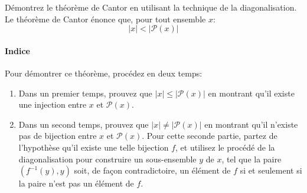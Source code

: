 \documentclass[12pt,french,a4paper]{article}
\begin{document}
\begin{question}
Démontrez le théorème de Cantor en utilisant la technique de la diagonalisation.
Le théorème de Cantor énonce que, pour tout ensemble $x$:
\[
|x| < |\mathcal{P}(x)|
\]

\paragraph{Indice} Pour démontrer ce théorème, procédez en deux temps:
\begin{enumerate}
\item
Dans un premier temps, prouvez que $|x| \leq |\mathcal{P}(x)|$ en montrant qu'il existe une injection entre $x$ et $\mathcal{P}(x)$.
\item
Dans un second temps, prouvez que $|x| \neq |\mathcal{P}(x)|$ en montrant qu'il n'existe pas de bijection entre $x$ et $\mathcal{P}(x)$.
Pour cette seconde partie, partez de l'hypothèse qu'il existe une telle bijection $f$, et utilisez le procédé de la diagonalisation pour construire un sous-ensemble $y$ de $x$, tel que la paire $(f^{-1}(y), y)$ soit, de façon contradictoire, un élément de $f$ si et seulement si la paire n'est pas un élément de $f$.
\end{enumerate}
\end{question}
\end{document}
